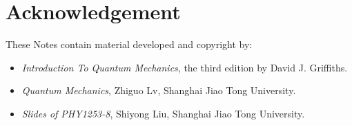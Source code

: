 \section*{Acknowledgement}
These Notes contain material developed and copyright by:
\begin{itemize}
	\item
		\textit{Introduction To Quantum Mechanics}, {\textcopyright} the third edition by David J. Griffiths.
	\item 
		\textit{Quantum Mechanics}, {\textcopyright} Zhiguo Lv, Shanghai Jiao Tong University.
	\item
		\textit{Slides of PHY1253-8}, {\textcopyright} Shiyong Liu, Shanghai Jiao Tong University.
\end{itemize}
